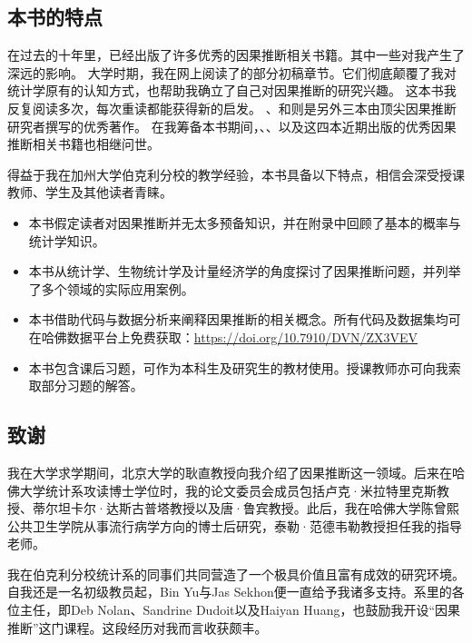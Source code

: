  


\subsection*{本书的特点}


在过去的十年里，已经出版了许多优秀的因果推断相关书籍。其中一些对我产生了深远的影响。  
大学时期，我在网上阅读了\citet{imbens2015causal}的部分初稿章节。它们彻底颠覆了我对统计学原有的认知方式，也帮助我确立了自己对因果推断的研究兴趣。  
\citet{angrist2008mostly}这本书我反复阅读多次，每次重读都能获得新的启发。  
\citet{rosenbaum2002design}、\citet{morgan2015counterfactuals}和\citet{hernan2020causal}则是另外三本由顶尖因果推断研究者撰写的优秀著作。  
在我筹备本书期间，\citet{cunningham2021causal}、\citet{huntington2022effect}、\citet{brumback2022fundamentals}以及\citet{huber2023causal}这四本近期出版的优秀因果推断相关书籍也相继问世。 


得益于我在加州大学伯克利分校的教学经验，本书具备以下特点，相信会深受授课教师、学生及其他读者青睐。 
\begin{itemize}
\item
本书假定读者对因果推断并无太多预备知识，并在附录中回顾了基本的概率与统计学知识。

\item
本书从统计学、生物统计学及计量经济学的角度探讨了因果推断问题，并列举了多个领域的实际应用案例。 

\item
本书借助代码与数据分析来阐释因果推断的相关概念。所有代码及数据集均可在哈佛数据平台上免费获取：\url{https://doi.org/10.7910/DVN/ZX3VEV}

\item
本书包含课后习题，可作为本科生及研究生的教材使用。授课教师亦可向我索取部分习题的解答。 
\end{itemize}




\subsection*{致谢}



我在大学求学期间，北京大学的耿直教授向我介绍了因果推断这一领域。后来在哈佛大学统计系攻读博士学位时，我的论文委员会成员包括卢克·米拉特里克斯教授、蒂尔坦卡尔·达斯古普塔教授以及唐·鲁宾教授。此后，我在哈佛大学陈曾熙公共卫生学院从事流行病学方向的博士后研究，泰勒·范德韦勒教授担任我的指导老师。   


我在伯克利分校统计系的同事们共同营造了一个极具价值且富有成效的研究环境。自我还是一名初级教员起，Bin Yu与Jas Sekhon便一直给予我诸多支持。系里的各位主任，即Deb Nolan、Sandrine Dudoit以及Haiyan Huang，也鼓励我开设“因果推断”这门课程。这段经历对我而言收获颇丰。  


